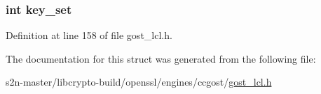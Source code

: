 \subsubsection[{\texorpdfstring{key\+\_\+set}{key_set}}]{\setlength{\rightskip}{0pt plus 5cm}int key\+\_\+set}\hypertarget{structossl__gost__imit__ctx_a77761b1f4ad7895ba894c134c03b98df}{}\label{structossl__gost__imit__ctx_a77761b1f4ad7895ba894c134c03b98df}


Definition at line 158 of file gost\+\_\+lcl.\+h.



The documentation for this struct was generated from the following file\+:\begin{DoxyCompactItemize}
\item 
s2n-\/master/libcrypto-\/build/openssl/engines/ccgost/\hyperlink{gost__lcl_8h}{gost\+\_\+lcl.\+h}\end{DoxyCompactItemize}
